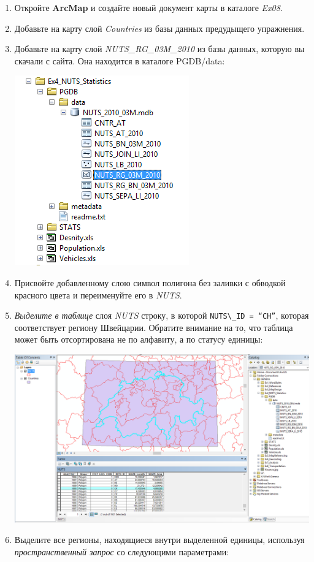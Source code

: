 \documentclass[]{book}
\theoremstyle{definition}
\theoremstyle{definition}
\theoremstyle{definition}
\theoremstyle{remark}
\begin{document}
\begin{enumerate}
\def\labelenumi{\arabic{enumi}.}
\item
  Откройте \textbf{ArcMap} и создайте новый документ карты в каталоге
  \emph{Ex08}.
\item
  Добавьте на карту слой \emph{Countries} из базы данных предудыщего
  упражнения.
\item
  Добавьте на карту слой \emph{NUTS\_RG\_03M\_2010} из базы данных,
  которую вы скачали с сайта. Она находится в каталоге PGDB/data:

  \includegraphics{images/Ex08/image17.png}
\item
  Присвойте добавленному слою символ полигона без заливки с обводкой
  красного цвета и переименуйте его в \emph{NUTS}.
\item
  \emph{Выделите в таблице} слоя \emph{NUTS} строку, в которой
  \texttt{NUTS\textbackslash{}\_ID\ =\ “CH”}, которая соответствует
  региону Швейцарии. Обратите внимание на то, что таблица может быть
  отсортирована не по алфавиту, а по статусу единицы:

  \includegraphics{images/Ex08/image18.png}
\item
  Выделите все регионы, находящиеся внутри выделенной единицы, используя
  \emph{пространственный запрос} со следующими параметрами:


\end{enumerate}
\end{document}
